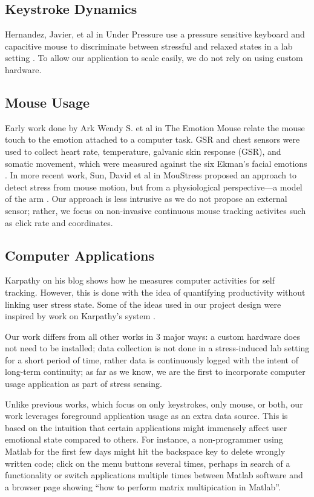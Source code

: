 \documentclass{article}
\begin{document}
\subsection{Keystroke Dynamics}
Hernandez, Javier, et al in Under Pressure use a pressure sensitive keyboard and capacitive mouse to discriminate between stressful and relaxed states in a lab setting \cite{hernandez2014under}. To allow our application to scale easily, we do not rely on using custom hardware.

\subsection{Mouse Usage}
Early work done by Ark Wendy S. et al in The Emotion Mouse relate the mouse touch to the emotion attached to a computer task. GSR and chest sensors were used to collect heart rate, temperature, galvanic skin response (GSR), and somatic movement, which were measured against the six Ekman’s facial emotions \cite{ark1999emotion}. In more recent work, Sun, David et al in MouStress proposed an approach to detect stress from mouse motion, but from a physiological perspective---a model of the arm \cite{sun2014moustress}. Our approach is less intrusive as we do not propose an external sensor; rather, we focus on  non-invasive continuous mouse tracking activites such as click rate and coordinates.

\subsection{Computer Applications}
Karpathy on his blog shows how he measures computer activities for self tracking. However, this is done with the idea of quantifying productivity without linking user stress state. Some of the ideas used in our project design were inspired by work on Karpathy's system \cite{karpathy}.

Our work differs from all other works in 3 major ways: a custom hardware does not need to be installed; data collection is not done in a stress-induced lab setting for a short period of time, rather data is continuously logged with the intent of long-term continuity; as far as we know, we are the first to incorporate computer usage application as part of stress sensing. 

Unlike previous works, which focus on only keystrokes, only mouse, or both, our work leverages foreground application usage as an extra data source. This is based on the intuition that certain applications might immensely affect user emotional state compared to others. For instance, a non-programmer using Matlab for the first few days might hit the backspace key to delete wrongly written code; click on the menu buttons several times, perhaps in search of a functionality or switch applications multiple times between Matlab software and a browser page showing ``how to perform matrix multipication in Matlab''.
\end{document}
